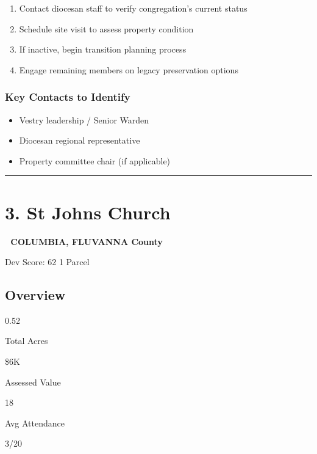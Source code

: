 \documentclass[
  letterpaper,
  DIV=11,
  numbers=noendperiod,
  oneside]{scrreprt}
\providecommand{\tightlist}{%
  \setlength{\itemsep}{0pt}\setlength{\parskip}{0pt}}
\begin{document}
\begin{enumerate}
\def\labelenumi{\arabic{enumi}.}
\tightlist
\item
  Contact diocesan staff to verify congregation's current status
\item
  Schedule site visit to assess property condition
\item
  If inactive, begin transition planning process
\item
  Engage remaining members on legacy preservation options
\end{enumerate}

\subsubsection{Key Contacts to
Identify}\label{key-contacts-to-identify-1}

\begin{itemize}
\tightlist
\item[$\square$]
  Vestry leadership / Senior Warden
\item[$\square$]
  Diocesan regional representative
\item[$\square$]
  Property committee chair (if applicable)
\end{itemize}

\begin{center}\rule{0.5\linewidth}{0.5pt}\end{center}

\section*{3. St Johns Church}\label{st-johns-church}


\textbf{📍 COLUMBIA, FLUVANNA County}

{Dev Score: 62} {1 Parcel}

\subsection{Overview}

{0.52}

{Total Acres}

{\$6K}

{Assessed Value}

{18}

{Avg Attendance}

{3/20}
\end{document}
